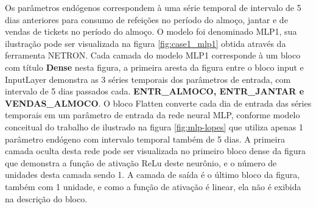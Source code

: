         Os parâmetros endógenos correspondem à uma série temporal de intervalo de 5 dias anteriores para consumo de refeições no período do almoço, jantar e de vendas de tickets no período do almoço.
        O modelo foi denominado MLP1, sua ilustração pode ser visualizada na figura \ref{fig:case1_mlp1} obtida através da ferramenta NETRON. Cada camada do modelo MLP1 corresponde à um bloco com título \textbf{Dense} nesta figura, a primeira aresta da figura entre o bloco input e InputLayer demonstra as 3 séries temporais dos parâmetros de entrada, com intervalo de 5 dias passados cada. \textbf{ENTR\_ALMOCO, ENTR\_JANTAR e VENDAS\_ALMOCO}. O bloco Flatten converte cada dia de entrada das séries temporais em um parâmetro de entrada da rede neural MLP, conforme modelo conceitual do trabalho de  ilustrado na figura \ref{fig:mlp-lopes} que utiliza apenas 1 parâmetro endógeno com intervalo temporal também de 5 dias. A primeira camada oculta desta rede pode ser visualizada no primeiro bloco dense da figura que demonstra a função de ativação ReLu deste neurônio, e o número de unidades desta camada sendo 1.
        A camada de saída é o último bloco da figura, também com 1 unidade, e como a função de ativação é linear, ela não é exibida na descrição do bloco.
        \begin{figure}[H]
        \end{figure}

